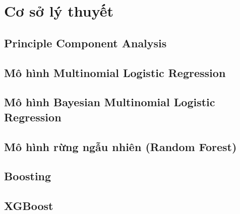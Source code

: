 \documentclass[14pt, a4paper]{article}
\theoremstyle{sltheorem}
\theoremstyle{soltheorem}
\begin{document}
    

    

    

    

    \section{Cơ sở lý thuyết}

    \subsection{Principle Component Analysis}

    

    \subsection{Mô hình Multinomial Logistic Regression}

    

    \subsection{ Mô hình Bayesian Multinomial Logistic Regression}

    

    \subsection{Mô hình rừng ngẫu nhiên (Random Forest)}

    

    \subsection{Boosting}
    
    

    \subsection{XGBoost}

    

    


\newpage
\printbibliography[title={TÀI LIỆU THAM KHẢO}]
\end{document}

